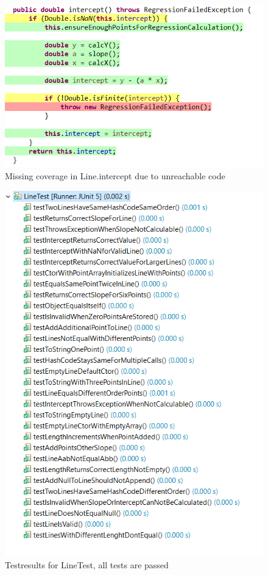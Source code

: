 \begin{figure}[h!]
    \begin{center}
        \includegraphics{img/missingcov.png}
        \caption{Missing coverage in Line.intercept due to unreachable code}
        \label{fig:missing_cov}
    \end{center}
\end{figure}

\begin{figure}[p!]
    \begin{center}
        \includegraphics{img/testresults.png}
        \caption{Testresults for LineTest, all tests are passed}
        \label{fig:test_results}
    \end{center}
\end{figure}

